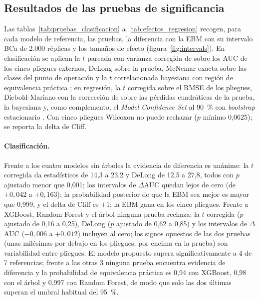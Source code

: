 \subsection{Resultados de las pruebas de significancia}
\label{sec:pruebas}

Las tablas~\ref{tab:pruebas_clasificacion} a~\ref{tab:efectos_regresion} recogen, para cada modelo de
referencia, las pruebas, la diferencia con la EBM con su intervalo BCa de 2.000 réplicas y los tamaños de
efecto (figura~\ref{fig:intervals}). En
clasificación se aplican la $t$ pareada con varianza corregida de \citet{nadeau2003} sobre los AUC de los
cinco pliegues externos, DeLong \citep{delong1988} sobre la prueba, McNemar exacta \citep{mcnemar1947} sobre
las clases del punto de operación y la $t$ correlacionada bayesiana con región de equivalencia práctica
\citep{corani2015,benavoli2017}; en regresión, la $t$ corregida sobre el RMSE de los pliegues, Diebold-Mariano
con la corrección de \citet{harvey1997} sobre las pérdidas cuadráticas de la prueba, la bayesiana y, como
complemento, el \emph{Model Confidence Set} al 90~\% \citep{hansen2011mcs} con \emph{bootstrap} estacionario
\citep{politis1994}. Con cinco pliegues Wilcoxon no puede rechazar ($p$ mínimo 0,0625); se reporta la delta
de Cliff.

\paragraph{Clasificación.}
Frente a los cuatro modelos sin árboles la evidencia de diferencia es unánime: la $t$ corregida da
estadísticos de 14,3 a 23,2 y DeLong de 12,5 a 27,8, todos con $p$ ajustado menor que 0,001; los intervalos
de $\Delta$AUC quedan lejos de cero (de $+0{,}042$ a $+0{,}163$); la probabilidad posterior de que la EBM sea
mejor es mayor que 0,999, y el delta de Cliff es $+1$: la EBM gana en los cinco pliegues. Frente a XGBoost,
Random Forest y el árbol ninguna prueba rechaza: la $t$ corregida ($p$ ajustado de 0,16 a 0,25), DeLong ($p$
ajustado de 0,62 a 0,85) y los intervalos de $\Delta$AUC ($-0{,}006$ a $+0{,}012$) incluyen al cero; los signos
opuestos de las dos pruebas (unas milésimas por debajo en los pliegues, por encima en la prueba) son
variabilidad entre pliegues. El modelo
propuesto supera significativamente a 4 de 7 referencias; frente a las otras 3 ninguna prueba encuentra
evidencia de diferencia y la probabilidad de equivalencia práctica es 0,94 con XGBoost, 0,98 con el árbol y
0,997 con Random Forest, de modo que solo las dos últimas superan el umbral habitual del 95~\%.

